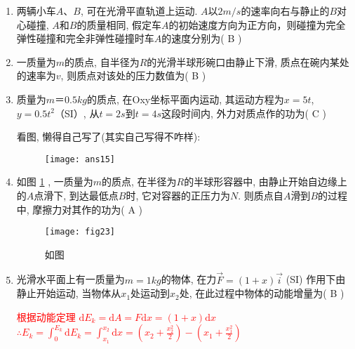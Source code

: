 \begin{enumerate}
\begin{note}
   \end{note}
   \item  两辆小车$A$、$B$, 可在光滑平直轨道上运动. $A$以$2 m/s$的速率向右与静止的$B$对心碰撞, $A$和$B$的质量相同, 假定车$A$的初始速度方向为正方向，则碰撞为完全弹性碰撞和完全非弹性碰撞时车$A$的速度分别为( B )                         
    \item 一质量为$m$的质点, 自半径为$R$的光滑半球形碗口由静止下滑, 质点在碗内某处的速率为$v$, 则质点对该处的压力数值为( B )                
    \item 质量为$m＝0.5kg$的质点, 在Oxy坐标平面内运动, 其运动方程为$x=5t$, $y=0.5t^2$（SI）, 从$t=2s$到$t=4s$这段时间内, 外力对质点作的功为( C )
    \begin{note}
        看图, 懒得自己写了(其实自己写得不咋样):
    \end{note}
    \begin{figure}[H]
        \centering
        \texttt{[image: ans15]}
    \end{figure}
    \item 如图 \ref{Fig:23} , 一质量为$m$的质点, 在半径为$R$的半球形容器中, 由静止开始自边缘上的$A$点滑下, 到达最低点$B$时, 它对容器的正压力为$N$. 则质点自$A$滑到$B$的过程中, 摩擦力对其作的功为( A )
    \begin{figure}[H]
        \centering
        \texttt{[image: fig23]}
            \caption{如图}\label{Fig:23}
    \end{figure}
    \item 光滑水平面上有一质量为$m=1kg$的物体, 在力$\vec{F} = (1+x)\vec{i}$  (SI) 作用下由静止开始运动, 当物体从$x_1$处运动到$x_2$处, 在此过程中物体的动能增量为( B )
    \begin{note}
        \textcolor{red}{ 根据动能定理 $\mathrm{d}E_k = \mathrm{d}A = F\mathrm{d}x = (1+x)\mathrm{d}x$\ \ \\
        $\therefore E_k = \displaystyle{\int_0^{E_k}\mathrm{d}E_k=\int_{x_1}^{x_2}\mathrm{d}x = \left(x_2+\frac{x_2^2}{2}\right)-\left(x_1+\frac{x_1^2}{2}\right)}$}

\end{note}
\end{enumerate}
